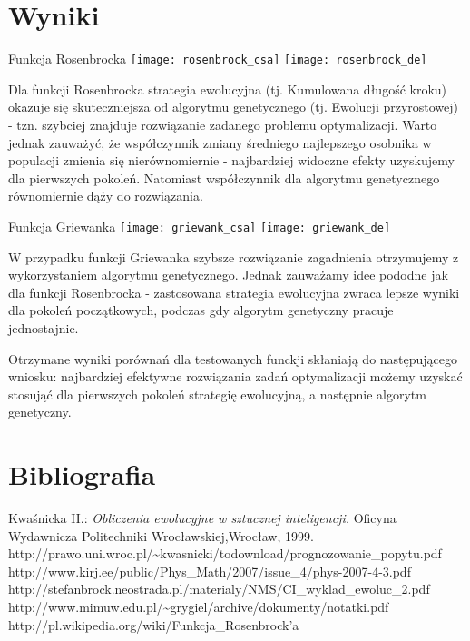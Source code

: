 \documentclass[11pt]{article}
\begin{document}
\section{Wyniki}

Funkcja Rosenbrocka\newline
\texttt{[image: rosenbrock\_csa]}\newline
\texttt{[image: rosenbrock\_de]}\newline

Dla funkcji Rosenbrocka strategia ewolucyjna 
(tj. Kumulowana długość kroku) okazuje się 
skuteczniejsza od algorytmu genetycznego
(tj. Ewolucji przyrostowej) - tzn. szybciej 
znajduje rozwiązanie zadanego problemu optymalizacji. 
Warto jednak zauważyć, że współczynnik zmiany średniego
najlepszego osobnika w populacji zmienia się nierównomiernie
- najbardziej widoczne efekty uzyskujemy dla pierwszych 
pokoleń. Natomiast współczynnik dla algorytmu genetycznego
równomiernie dąży do rozwiązania. 
\newpage

Funkcja Griewanka\newline
\texttt{[image: griewank\_csa]}\newline
\texttt{[image: griewank\_de]}\newline
\newpage

W przypadku funkcji Griewanka szybsze rozwiązanie
zagadnienia otrzymujemy z wykorzystaniem algorytmu 
genetycznego. Jednak zauważamy idee pododne jak dla
funkcji Rosenbrocka - zastosowana strategia ewolucyjna
zwraca lepsze wyniki dla pokoleń początkowych, podczas
gdy algorytm genetyczny pracuje jednostajnie.

Otrzymane wyniki porównań dla testowanych funckji 
skłaniają do następującego wniosku:
najbardziej efektywne rozwiązania zadań optymalizacji
możemy uzyskać stosująć dla pierwszych pokoleń strategię
ewolucyjną, a następnie algorytm genetyczny.
\newpage

\section{Bibliografia}
Kwaśnicka H.: \textit{Obliczenia ewolucyjne w sztucznej inteligencji.} 
\newline Oficyna Wydawnicza Politechniki Wrocławskiej,Wrocław, 1999. \newline
http://prawo.uni.wroc.pl/\~{}kwasnicki/todownload/prognozowanie\_popytu.pdf \newline
http://www.kirj.ee/public/Phys\_Math/2007/issue\_4/phys-2007-4-3.pdf \newline
http://stefanbrock.neostrada.pl/materialy/NMS/CI\_wyklad\_ewoluc\_2.pdf \newline
http://www.mimuw.edu.pl/\~{}grygiel/archive/dokumenty/notatki.pdf \newline
http://pl.wikipedia.org/wiki/Funkcja\_Rosenbrock'a
\end{document}
